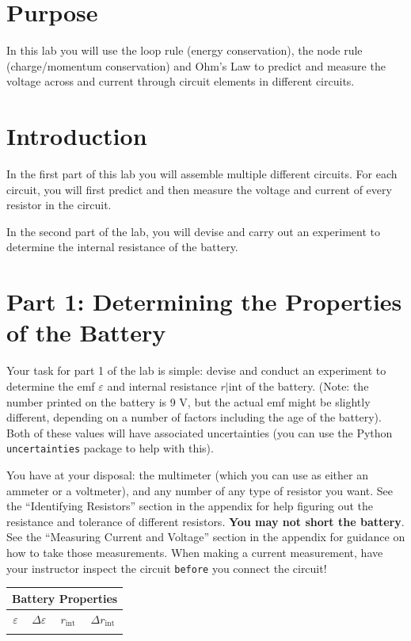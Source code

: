\documentclass[12pt]{article}
\begin{document}
	\section*{Purpose}
	In this lab you will use the loop rule (energy conservation), the node rule (charge/momentum conservation) and Ohm's Law to predict and measure the voltage across and current through circuit elements in different circuits.
	
	\section*{Introduction}
	In the first part of this lab you will assemble multiple different circuits. For each circuit, you will first predict and then measure the voltage and current of every resistor in the circuit.
	
	In the second part of the lab, you will devise and carry out an experiment to determine the internal resistance of the battery.
	
	
	
	\section*{Part 1: Determining the Properties of the Battery}
	Your task for part 1 of the lab is simple: devise and conduct an experiment to determine the emf $\varepsilon$ and internal resistance $r|\mathrm{int}$ of the battery. (Note: the number printed on the battery is 9 V, but the actual emf might be slightly different, depending on a number of factors including the age of the battery). Both of these values will have associated uncertainties (you can use the Python \texttt{uncertainties} package to help with this).
	
	You have at your disposal: the multimeter (which you can use as either an ammeter or a voltmeter), and any number of any type of resistor you want. See the ``Identifying Resistors'' section in the appendix for help figuring out the resistance and tolerance of different resistors. \textbf{You may not short the battery}. See the ``Measuring Current and Voltage'' section in the appendix for guidance on how to take those measurements. When making a current measurement, have your instructor inspect the circuit \texttt{before} you connect the circuit!
	
	
	\begin{table}[ht]
		\centering
		\begin{tabular}{|c|c|c|c|}
			\multicolumn{4}{c}{\textbf{Battery Properties}}\\ \hline
			$\varepsilon$ & $\Delta \varepsilon$ & $r_\mathrm{int}$ & $\Delta r_\mathrm{int}$\\ \hline
			& & & \\ \hline
		\end{tabular}
	\end{table}
\end{document}
